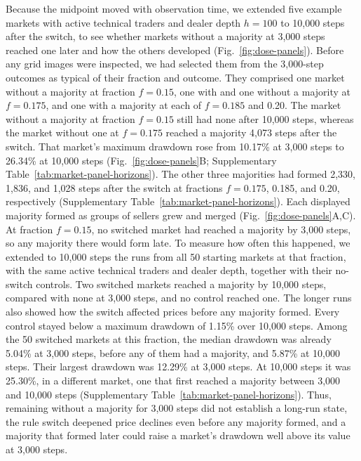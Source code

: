 Because the midpoint moved with observation time, we extended five
example markets with active technical traders and dealer depth $h=100$
to 10,000 steps after the switch, to see whether markets without a
majority at 3,000 steps reached one later and how the others developed
(Fig.~\ref{fig:dose-panels}). Before any grid
images were inspected, we had selected them from the 3,000-step outcomes
as typical of their fraction and outcome. They comprised one market
without a majority at fraction $f=0.15$, one with and one without a
majority at $f=0.175$, and one with a majority at each of $f=0.185$ and
0.20. The market without a majority at fraction $f=0.15$ still had none
after 10,000 steps, whereas the market without one at $f=0.175$ reached
a majority 4{,}073 steps after the switch. That market's maximum
drawdown rose
from 10.17\% at 3,000 steps to 26.34\% at 10,000 steps
(Fig.~\ref{fig:dose-panels}B; Supplementary
Table~\ref{tab:market-panel-horizons}). The other three majorities had formed
2{,}330, 1{,}836, and 1{,}028 steps after the switch at fractions
$f=0.175$, 0.185, and 0.20, respectively (Supplementary
Table~\ref{tab:market-panel-horizons}). Each displayed majority formed
as groups of sellers grew and merged (Fig.~\ref{fig:dose-panels}A,C).
At fraction $f=0.15$, no switched market had reached a majority by
3,000 steps, so any majority there would form late. To measure how
often this happened, we extended to 10,000 steps the runs from all 50
starting markets at that fraction, with the same active technical
traders and dealer depth, together with their no-switch controls. Two
switched markets reached a majority by 10,000 steps, compared with none
at 3,000 steps, and no control reached one. The longer runs also showed
how the switch affected prices before any majority formed. Every
control stayed below a maximum drawdown of 1.15\% over 10,000 steps.
Among the 50 switched markets at this fraction, the median drawdown was
already 5.04\% at 3,000 steps, before any of them had a majority, and
5.87\% at 10,000 steps. Their largest drawdown was 12.29\% at 3,000
steps. At 10,000 steps it was 25.30\%, in a different market, one that first reached a majority between 3,000
and 10,000 steps
(Supplementary Table~\ref{tab:market-panel-horizons}). Thus, remaining
without a majority for 3,000 steps did not establish a long-run state,
the rule switch deepened price declines even before any majority formed,
and a majority that formed later could raise a market's drawdown well
above its value at 3,000 steps.

